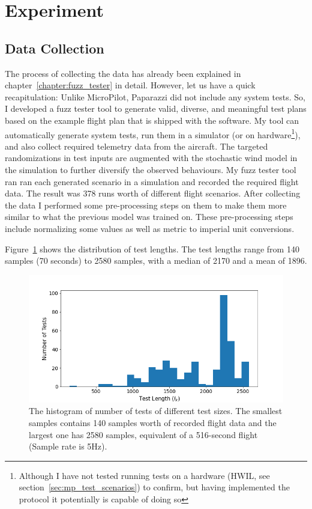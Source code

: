 \section{Experiment}
\subsection{Data Collection}
The process of collecting the data has already been explained in chapter~\ref{chapter:fuzz_tester} in detail. However, let us have a quick recapitulation:
Unlike MicroPilot, Paparazzi did not include any system tests. So, I developed a fuzz tester tool to generate valid, diverse, and meaningful test plans based on the example flight plan that is shipped with the software. My tool can automatically generate system tests, run them in a simulator (or on hardware\footnote{Although I have not tested running tests on a hardware (HWIL, see section~\ref{sec:mp_test_scenarios}) to confirm, but having implemented the protocol it potentially is capable of doing so}), and also collect required telemetry data from the aircraft. The targeted randomizations in test inputs are augmented with the stochastic wind model in the simulation to further diversify the observed behaviours. My fuzz tester tool ran ran each generated scenario in a simulation and recorded the required flight data.
The result was 378 runs worth of different flight scenarios.
After collecting the data I performed some pre-processing steps on them to make them more similar to what the previous model was trained on. These pre-processing steps include normalizing some values as well as metric to imperial unit conversions.

Figure~\ref{fig:paparazzi_test_length} shows the distribution of test lengths. The test lengths range from 140 samples (70 seconds) to 2580 samples, with a median of 2170 and a mean of 1896.
\begin{figure}
    \centering
    \includegraphics{6_files/test_lengths.png}
    \caption{The histogram of number of tests of different test sizes. The smallest samples contains 140 samples worth of recorded flight data and the largest one has 2580 samples, equivalent of a 516-second flight (Sample rate is 5Hz). }
    \label{fig:paparazzi_test_length}
\end{figure}


